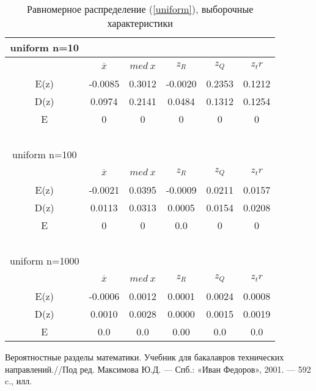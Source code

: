 \documentclass[12pt,a4paper]{article}
\begin{document}
			\begin{table}[htp]
				\label{tabular:uniform}
				\begin{center}
					\begin{tabular}{|c|c|c|c|c|c|} 
						
						\hline
						uniform n=10 & \ & \ & \ & \ & \ \\ \hline
						\ & $\overline{x}$ & $med \ x$ & $z_R$ & $z_Q$ & $z_tr$ \\ \hline
						E(z) & -0.0085 & 0.3012 & -0.0020 & 0.2353 & 0.1212 \\ \hline
						D(z) & 0.0974 & 0.2141 & 0.0484 &  0.1312  &  0.1254 \\ \hline
						E & 0 & 0 & 0 & 0 & 0\\\hline
						\ & \ & \ & \ & \ & \ \\ \hline
						
						uniform n=100 & \ & \ & \ & \ & \ \\ \hline
						\ & $\overline{x}$ & $med \ x$  & $z_R$  & $z_Q$  & $z_tr$ \\ \hline
						E(z) & -0.0021 & 0.0395 &  -0.0009 & 0.0211 & 0.0157 \\ \hline
						D(z) & 0.0113   & 0.0313 & 0.0005 &  0.0154 & 0.0208 \\ \hline
						E & 0 & 0 & 0.0 & 0 & 0\\\hline
						\ & \ & \ & \ & \ & \ \\ \hline
						
						uniform n=1000 & \ & \ & \ & \ & \ \\ \hline
						\ & $\overline{x}$ & $med \ x$  & $z_R$  & $z_Q$  & $z_tr$ \\ \hline
						E(z) & -0.0006 & 0.0012 & 0.0001 & 0.0024 & 0.0008 \\ \hline
						D(z) & 0.0010   & 0.0028 & 0.0000 &  0.0015  &  0.0019 \\ \hline
						E & 0.0 & 0.0 & 0.00 & 0.0 & 0.0\\\hline
						
					\end{tabular}
				\end{center}
				\caption{Равномерное распределение (\ref{uniform}), выборочные характеристики}
			\end{table}
		\clearpage
	\newpage
	
	\begin{thebibliography}{1}
		  Вероятностные разделы математики. Учебник для бакалавров технических направлений.//Под ред. Максимова Ю.Д. — Спб.: «Иван Федоров», 2001. — 592 c., илл.
	\end{thebibliography}
	
		
\end{document}
